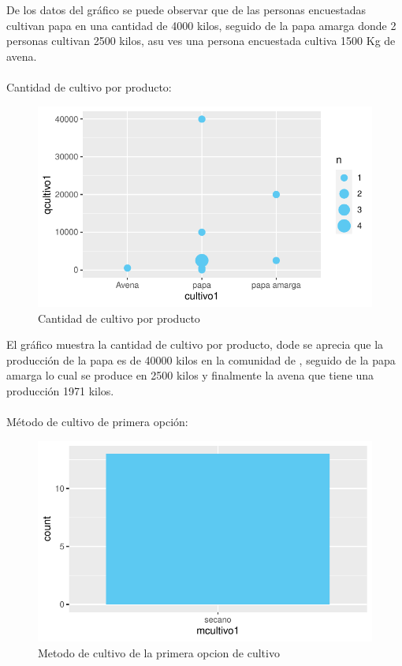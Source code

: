 \documentclass[12pt]{article}\usepackage[]{graphicx}\usepackage[]{xcolor}
\makeatletter
\def\maxwidth{ %
  \ifdim\Gin@nat@width>\linewidth
    \linewidth
  \else
    \Gin@nat@width
  \fi
}
\newenvironment{knitrout}{}{} %
\makeatother
\begin{document}
	De los datos del gráfico se puede observar que de las personas encuestadas cultivan papa  en una cantidad de 4000 kilos, seguido de la papa amarga donde 2 personas cultivan 2500 kilos, asu ves una persona  encuestada cultiva 1500 Kg de avena.\\
	\\
	Cantidad de cultivo por producto:
	\begin{figure}[H]
	\centering
\begin{knitrout}
\color{fgcolor}
\includegraphics[width=\maxwidth]{figure/oneh-1} 
\end{knitrout}
	\caption{Cantidad de cultivo por producto}
	\end{figure}
	El gráfico muestra la cantidad de cultivo por producto, dode se aprecia que la producción de la papa es de 40000 kilos en la comunidad de \comunidad, seguido de la papa amarga lo cual se produce en 2500 kilos y finalmente la avena que tiene una producción 1971 kilos.\\
	\\
	Método de cultivo de primera opción:
	\begin{figure}[H]
	\centering
\begin{knitrout}
\color{fgcolor}
\includegraphics[width=\maxwidth]{figure/twelve-1} 
\end{knitrout}
	\caption{Metodo de cultivo de la primera opcion de cultivo}
	\end{figure}
\end{document}
